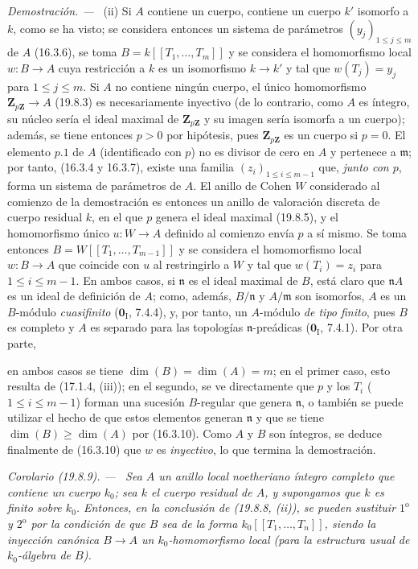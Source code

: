 \documentclass[10pt,oneside]{book}
\makeatletter
\newcommand{\setmanualcurrentlabel}[1]{\def\@currentlabel{#1}}
\newcommand{\oldpage}[2][]{%
  \setcounter{footnote}{0}%
  \marginpar{\scriptsize\textbf{#1}~|~#2}\ignorespaces}
\newenvironment{corollary}[1][]{%
  \setmanualcurrentlabel{#1}\par\medskip\noindent\itshape Corolario (#1). ---\ }{\par}
\newenvironment{proof}{%
  \par\medskip\noindent\textit{Demostración. ---\ }}{\par}
\providecommand{\setmin}{-}%
\makeatother
\begin{document}
\begin{proof}
\medskip
\noindent(ii)\enspace
Si $A$ contiene un cuerpo, contiene un cuerpo $k'$ isomorfo a $k$, como se ha
visto; se considera entonces un sistema de parámetros
$(y_j)_{1\leq j\leq m}$ de $A$ (16.3.6), se toma
$B=k[[T_1,\ldots,T_m]]$ y se considera el homomorfismo local $w:B\to A$ cuya
restricción a $k$ es un isomorfismo $k\to k'$ y tal que
$w(T_j)=y_j$ para $1\leq j\leq m$. Si $A$ no contiene ningún cuerpo, el único
homomorfismo $\mathbf Z_{p\mathbf Z}\to A$ (19.8.3) es necesariamente
inyectivo (de lo contrario, como $A$ es íntegro, su núcleo sería el ideal
maximal de $\mathbf Z_{p\mathbf Z}$ y su imagen sería isomorfa a un cuerpo);
además, se tiene entonces $p>0$ por hipótesis, pues
$\mathbf Z_{p\mathbf Z}$ es un cuerpo si $p=0$. El elemento $p.1$ de $A$
(identificado con $p$) no es divisor de cero en $A$ y pertenece a
$\mathfrak m$; por tanto, (16.3.4 y 16.3.7), existe una familia
$(z_i)_{1\leq i\leq m-1}$ que, \emph{junto con $p$}, forma un sistema de parámetros
de $A$. El anillo de Cohen $W$ considerado al comienzo de la demostración es
entonces un anillo de valoración discreta de cuerpo residual $k$, en el que
$p$ genera el ideal maximal (19.8.5), y el homomorfismo único $u:W\to A$
definido al comienzo envía $p$ a sí mismo. Se toma entonces
$B=W[[T_1,\ldots,T_{m-1}]]$ y se considera el homomorfismo local $w:B\to A$
que coincide con $u$ al restringirlo a $W$ y tal que $w(T_i)=z_i$ para
$1\leq i\leq m\setmin 1$. En ambos casos, si $\mathfrak n$ es el ideal maximal de
$B$, está claro que $\mathfrak nA$ es un ideal de definición de $A$; como,
además, $B/\mathfrak n$ y $A/\mathfrak m$ son isomorfos, $A$ es un
$B$-módulo \emph{cuasifinito} ($\mathbf 0_{\mathrm I}$, 7.4.4), y, por tanto, un
$A$-módulo \emph{de tipo finito}, pues $B$ es completo y $A$ es
separado para las topologías $\mathfrak n$-preádicas
($\mathbf 0_{\mathrm I}$, 7.4.1). Por otra
parte,

\oldpage[0\textsubscript{IV-1}]{113}

en ambos casos se tiene $\dim(B)=\dim(A)=m$; en el primer caso, esto resulta
de (17.1.4, (iii)); en el segundo, se ve directamente que $p$ y los $T_i$
($1\leq i\leq m\setmin 1$) forman una sucesión $B$-regular que genera $\mathfrak n$,
o también se puede utilizar el hecho de que estos elementos generan
$\mathfrak n$ y que se tiene $\dim(B)\geq\dim(A)$ por (16.3.10). Como $A$ y
$B$ son íntegros, se deduce finalmente de (16.3.10) que $w$ es \emph{inyectivo}, lo
que termina la demostración.
\end{proof}

\begin{corollary}[19.8.9]
\label{0.19.8.9-es}
Sea $A$ un anillo local noetheriano íntegro completo que contiene un cuerpo
$k_0$; sea $k$ el cuerpo residual de $A$, y supongamos que $k$ es finito sobre
$k_0$. Entonces, en la conclusión de \textup{(19.8.8, (ii))}, se pueden sustituir
$1^{\mathrm o}$ y $2^{\mathrm o}$ por la condición de que $B$ sea de la forma
$k_0[[T_1,\ldots,T_n]]$, siendo la inyección canónica $B\to A$ un
$k_0$-homomorfismo local (para la estructura usual de $k_0$-álgebra de $B$).
\end{corollary}
\end{document}
